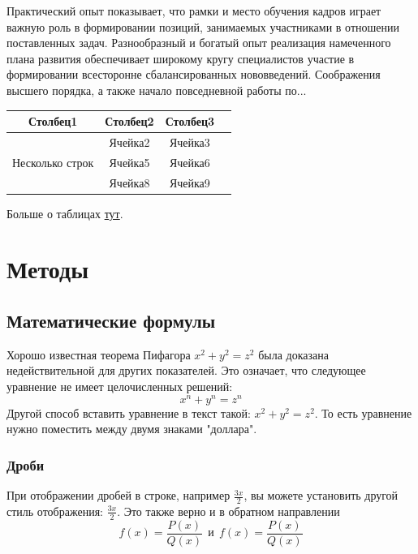 \documentclass[12pt, oneside, a4paper]{article} %
\begin{document}
\begin{sloppypar}
Практический опыт показывает, что рамки и место обучения кадров играет важную роль в формировании позиций, занимаемых участниками в отношении поставленных задач. Разнообразный и богатый опыт реализация намеченного плана развития обеспечивает широкому кругу специалистов участие в формировании всесторонне сбалансированных нововведений.
Соображения высшего порядка, а также начало повседневной работы по...

\begin{center} %
\begin{tabular}{ |c|c|c|c| } %
\hline
Столбец1 & Столбец2 & Столбец3 \\ %
\hline
\multirow{3}{5em}{Несколько строк} & Ячейка2 & Ячейка3 \\ 
& Ячейка5 & Ячейка6 \\ %
& Ячейка8 & Ячейка9 \\ 
\hline %
\end{tabular}
\end{center}

Больше о таблицах \href{https://www.overleaf.com/learn/latex/Tables}{тут}.


\section{Методы}
\subsection{Математические формулы}
Хорошо известная теорема Пифагора \(x^2 + y^2 = z^2\) была
доказана недействительной для других показателей.
Это означает, что следующее уравнение не имеет целочисленных решений:
\[ x^n + y^n = z^n \]
Другой способ вставить уравнение в текст такой: $x^2 + y^2 = z^2$. То есть уравнение нужно поместить между двумя знаками "доллара".

\subsubsection{Дроби}
При отображении дробей в строке, например \(\frac{3x}{2}\),
вы можете установить другой стиль отображения:
\( \displaystyle \frac{3x}{2} \).
Это также верно и в обратном направлении
\[ f(x)=\frac{P(x)}{Q(x)} \ \ \textrm{и}
\ \ f(x)=\textstyle\frac{P(x)}{Q(x)} \]


\end{sloppypar}
\end{document}
